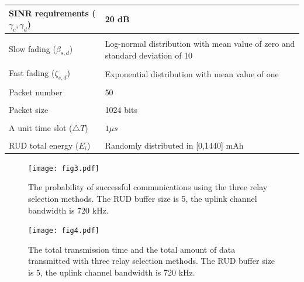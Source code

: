 \documentclass[conference]{IEEEtran}
\begin{document}
\begin{table}[!t]
\begin{tabular}{m{3cm}m{3cm}}
    SINR requirements ($\gamma_c,\gamma_d$) &  20 dB \\
    \hline
    \vspace{1mm}\\[-3mm]
    Slow fading ($\beta_{s,d}$) &  Log-normal distribution with mean value of zero and standard deviation of 10\\
    \hline
    \vspace{1mm}\\[-3mm]
    Fast fading ($\zeta_{s,d}$) &  Exponential distribution with mean value of one\\
    \hline
    \vspace{1mm}\\[-3mm]
    Packet number &  50 \\
    \hline
    \vspace{1mm}\\[-3mm]
    Packet size &  1024 bits\\
    \hline
    \vspace{1mm}\\[-3mm]
    A unit time slot ($\triangle T$) &  $1 \mu s$\\
    \hline
    \vspace{1mm}\\[-3mm]
    RUD total energy ($E_i$) &  Randomly distributed in [0,1440] mAh \\
    \hline
  \end{tabular}
\end{table}
\begin{figure}[!t]
\texttt{[image: fig3.pdf]}
\caption{The probability of successful communications using the three relay selection methods. The RUD buffer size is 5, the uplink channel bandwidth is 720 kHz.}
\label{fig_success}
\end{figure}

\begin{figure}[!t]
\center
\texttt{[image: fig4.pdf]}
\caption{The total transmission time and the total amount of data transmitted with three relay selection methods. The RUD buffer size is 5, the uplink channel bandwidth is 720 kHz.}
\label{fig_time}
\end{figure}
\end{document}
